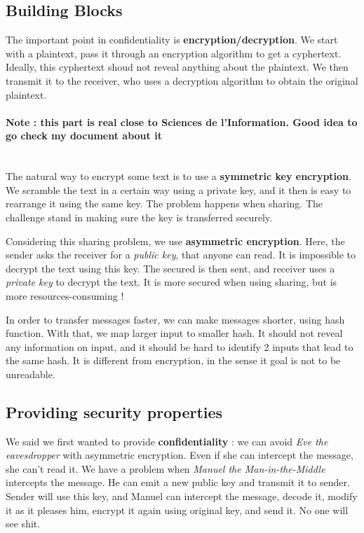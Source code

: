 \documentclass[12pt,a4paper]{article}
\begin{document}
\subsection{Building Blocks}
The important point in confidentiality is \textbf{encryption/decryption}. We start with a plaintext, pass it through an encryption algorithm to get a cyphertext. Ideally, this cyphertext shoud not reveal anything about the plaintext. We then transmit it to the receiver, who uses a decryption algorithm to obtain the original plaintext.
\paragraph{Note : this part is real close to Sciences de l'Information. Good idea to go check my document about it}~
\\

The natural way to encrypt some text is to use a \textbf{symmetric key encryption}. We scramble the text in a certain way using a private key, and it then is easy to rearrange it using the same key. The problem happens when sharing. The challenge stand in making sure the key is transferred securely. 

Considering this sharing problem, we use \textbf{asymmetric encryption}. Here, the sender asks the receiver for a \textit{public key}, that anyone can read. It is impossible to decrypt the text using this key. The secured is then sent, and receiver uses a \textit{private key} to decrypt the text. It is more secured when using sharing, but is more resources-consuming !

In order to transfer messages faster, we can make messages shorter, using  hash function. With that, we map larger input to smaller hash. It should not reveal any information on input, and it should be hard to identify 2 inputs that lead to the same hash. It is different from encryption, in the sense it goal is not to be unreadable.

\subsection[Security Properties]{Providing security properties}
We said we first wanted to provide \textbf{confidentiality} : we can avoid \textit{Eve the eavesdropper} with asymmetric encryption. Even if she can intercept the message, she can't read it. We have a problem when \textit{Manuel the Man-in-the-Middle} intercepts the message. He can emit a new public key and transmit it to sender. Sender will use this key, and Manuel can intercept the message, decode it, modify it as it pleases him, encrypt it again using original key, and send it. No one will see shit.
\end{document}
